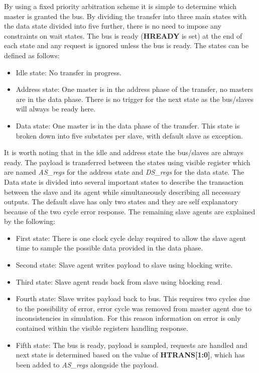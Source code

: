By using a fixed priority arbitration scheme it is simple to determine which master is granted the bus. 
By dividing the transfer into three main states with the data state divided into five further, there is no need to impose any constraints on wait states. The bus is ready (\textbf{HREADY} is set) at the end of each state and any request is ignored unless the bus is ready. The states can be defined as follows:
\begin{itemize}
\item Idle state: No transfer in progress.
\item Address state: One master is in the address phase of the transfer, no masters are in the data phase. There is no trigger for the next state as the bus/slaves will always be ready here. 
\item Data state: One master is in the data phase of the transfer. This state is broken down into five substates per slave, with default slave as exception.  
\end{itemize}


It is worth noting that in the idle and address state the bus/slaves are always ready. The payload is transferred between the states using visible register which are named \textit{AS\_regs} for the address state and \textit{DS\_regs} for the data state. The Data state is divided into several important states to describe the transaction between the slave and its agent while simultaneously describing all necessary outputs. The default slave has only two states and they are self explanatory because of the two cycle error response. The remaining slave agents are explained by the following:
\begin{itemize}
 \item First state: There is one clock cycle delay required to allow the slave agent time to sample the possible data provided in the data phase.
 \item Second state: Slave agent writes payload to slave using blocking write. 
 \item Third state: Slave agent reads back from slave using blocking read.
 \item Fourth state: Slave writes payload back to bus. This requires two cycles due to the possibility of error, error cycle was removed from master agent due to inconsistencies in simulation. For this reason information on error is only contained within the visible registers handling response.   
 \item Fifth state: The bus is ready, payload is sampled, requests are handled and next state is determined based on the value of \textbf{HTRANS[1:0]}, which has been added to \textit{AS\_regs} alongside the payload. 
\end{itemize}

